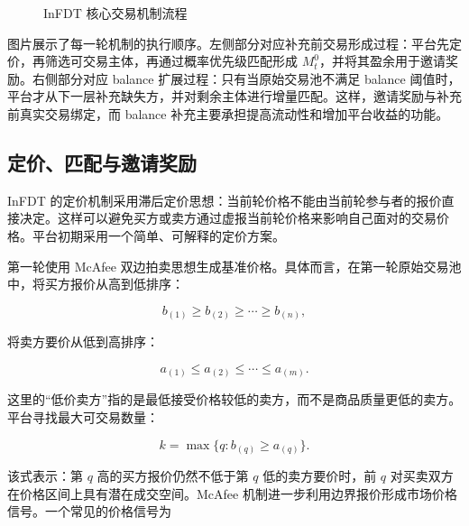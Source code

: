 \documentclass[UTF8,11pt]{ctexart}
\begin{document}
\begin{figure}[htbp]
{
    }
    \caption{InFDT 核心交易机制流程}
    \label{fig:infdt-mechanism-flow}
\end{figure}

图片展示了每一轮机制的执行顺序。左侧部分对应补充前交易形成过程：平台先定价，再筛选可交易主体，再通过概率优先级匹配形成 \(M_t^0\)，并将其盈余用于邀请奖励。右侧部分对应 balance 扩展过程：只有当原始交易池不满足 balance 阈值时，平台才从下一层补充缺失方，并对剩余主体进行增量匹配。这样，邀请奖励与补充前真实交易绑定，而 balance 补充主要承担提高流动性和增加平台收益的功能。

\subsection{定价、匹配与邀请奖励}

InFDT 的定价机制采用滞后定价思想：当前轮价格不能由当前轮参与者的报价直接决定。这样可以避免买方或卖方通过虚报当前轮价格来影响自己面对的交易价格。平台初期采用一个简单、可解释的定价方案。

第一轮使用 McAfee 双边拍卖思想生成基准价格。具体而言，在第一轮原始交易池中，将买方报价从高到低排序：

\[
    b_{(1)}\ge b_{(2)}\ge \cdots \ge b_{(n)},
\]

将卖方要价从低到高排序：

\[
    a_{(1)}\le a_{(2)}\le \cdots \le a_{(m)}.
\]

这里的“低价卖方”指的是最低接受价格较低的卖方，而不是商品质量更低的卖方。平台寻找最大可交易数量：

\[
    k=\max\{q:b_{(q)}\ge a_{(q)}\}.
\]

该式表示：第 \(q\) 高的买方报价仍然不低于第 \(q\) 低的卖方要价时，前 \(q\) 对买卖双方在价格区间上具有潜在成交空间。McAfee 机制进一步利用边界报价形成市场价格信号。一个常见的价格信号为
\end{document}
